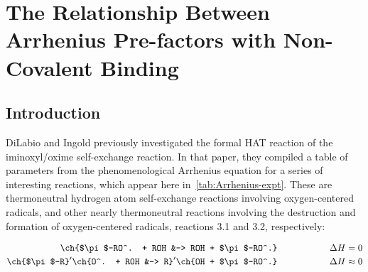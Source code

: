 
\chapter{The Relationship Between Arrhenius Pre-factors with Non-Covalent Binding}
\label{ch:arrhenius}

\begin{doublespace}
\section{Introduction}

DiLabio and Ingold\cite{DiLabio2005} previously investigated the formal HAT
reaction of the iminoxyl/oxime self-exchange reaction. In that paper, they
compiled a table of parameters from the phenomenological Arrhenius equation for
a series of interesting reactions, which appear here
in~\ref{tab:Arrhenius-expt}.\cite{Kreilick1966, Mader2004, Mahoney1970,
DaRooge1967, Howard1973, Foti1994, Chenier1974, Chenier1975} These are
thermoneutral hydrogen atom self-exchange reactions involving oxygen-centered
radicals, and other nearly thermoneutral reactions involving the destruction and
formation of oxygen-centered radicals, reactions 3.1 and 3.2, respectively:

\begin{align}
  \ch{$\pi$-RO^. + ROH &-> ROH + $\pi$-RO^.} \hspace{2cm} \Delta H = 0 \\
  \ch{$\pi$-R}^\prime\ch{O^. + ROH &-> R}^\prime\ch{OH + $\pi$-RO^.} \hspace{2cm} \Delta H \approx 0
\end{align}

\newcommand{\tabFig}[2][0.35]{\texttt{[image: figures/\#2.eps]}}


\end{doublespace}
